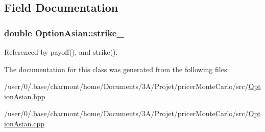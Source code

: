 \subsection{Field Documentation}
\hypertarget{classOptionAsian_a2b1952985f78ae8fd471275556fec724}{
\subsubsection[{strike\-\_\-}]{\setlength{\rightskip}{0pt plus 5cm}double Option\-Asian\-::strike\-\_\-\hspace{0.3cm}{\ttfamily [protected]}}}\label{classOptionAsian_a2b1952985f78ae8fd471275556fec724}


Referenced by payoff(), and strike().



The documentation for this class was generated from the following files\-:\begin{DoxyCompactItemize}
\item 
/user/0/.\-base/charmont/home/\-Documents/3\-A/\-Projet/pricer\-Monte\-Carlo/src/\hyperlink{OptionAsian_8hpp}{Option\-Asian.\-hpp}\item 
/user/0/.\-base/charmont/home/\-Documents/3\-A/\-Projet/pricer\-Monte\-Carlo/src/\hyperlink{OptionAsian_8cpp}{Option\-Asian.\-cpp}\end{DoxyCompactItemize}
